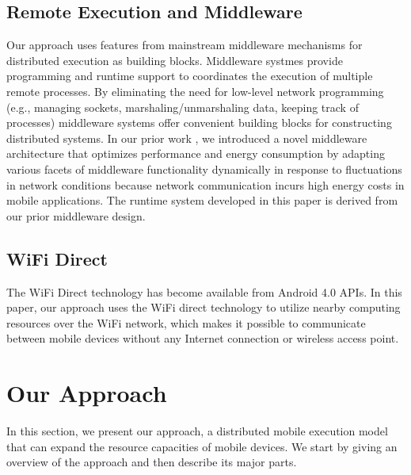 \documentclass{sig-alternate}[10pt]
\begin{document}
\subsection{Remote Execution and Middleware}
Our approach uses features from mainstream middleware mechanisms for distributed execution as building blocks. Middleware systmes provide programming and runtime support to coordinates the execution of multiple remote processes. By eliminating the need for low-level network programming (e.g., managing sockets, marshaling/unmarshaling data, keeping track of processes) middleware systems offer convenient building blocks for constructing distributed systems. In our prior work \cite{kwon+:mobicase14-middleware}, we introduced a novel middleware architecture that optimizes performance and energy consumption by adapting various facets of middleware functionality dynamically in response to fluctuations in network conditions because network communication incurs high energy costs in mobile applications. The runtime system developed in this paper is derived from our prior middleware design.

\subsection{WiFi Direct}
The WiFi Direct technology has become available from Android 4.0 APIs.
In this paper, our approach uses the WiFi direct technology \cite{wifi:p2p} to utilize nearby computing resources over the WiFi network, which makes it possible to communicate between mobile devices without any Internet connection or wireless access point. 

\section{Our Approach}
\label{sec:approach}
In this section, we present our approach, a distributed mobile execution model that can expand the resource capacities of mobile devices. We start by giving an overview of the approach and then describe its major parts.
\end{document}
